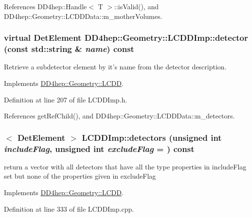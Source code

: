 References DD4hep::Handle$<$ T $>$::isValid(), and DD4hep::Geometry::LCDDData::m\_\-motherVolumes.\hypertarget{class_d_d4hep_1_1_geometry_1_1_l_c_d_d_imp_a43a6f0c97177fee5dda8b9a93cee6bad}{
\subsubsection[{detector}]{\setlength{\rightskip}{0pt plus 5cm}virtual {\bf DetElement} DD4hep::Geometry::LCDDImp::detector (const std::string \& {\em name}) const}}
\label{class_d_d4hep_1_1_geometry_1_1_l_c_d_d_imp_a43a6f0c97177fee5dda8b9a93cee6bad}


Retrieve a subdetector element by it's name from the detector description. 

Implements \hyperlink{class_d_d4hep_1_1_geometry_1_1_l_c_d_d_a0ed0c4e5d72a1e07ce11cf2592d6de3e}{DD4hep::Geometry::LCDD}.

Definition at line 207 of file LCDDImp.h.

References getRefChild(), and DD4hep::Geometry::LCDDData::m\_\-detectors.\hypertarget{class_d_d4hep_1_1_geometry_1_1_l_c_d_d_imp_ab46d786f0e67c07c818b2e022ddd6dc4}{
\subsubsection[{detectors}]{$<$ {\bf DetElement} $>$ LCDDImp::detectors (unsigned int {\em includeFlag}, \/  unsigned int {\em excludeFlag} = {}) const}}
\label{class_d_d4hep_1_1_geometry_1_1_l_c_d_d_imp_ab46d786f0e67c07c818b2e022ddd6dc4}
return a vector with all detectors that have all the type properties in includeFlag set but none of the properties given in excludeFlag 

Implements \hyperlink{class_d_d4hep_1_1_geometry_1_1_l_c_d_d_a1cdc7a631ac397f64b40e7232ee04639}{DD4hep::Geometry::LCDD}.

Definition at line 333 of file LCDDImp.cpp.

